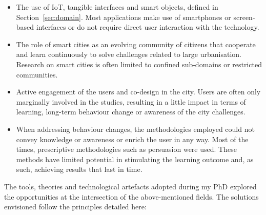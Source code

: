 \begin{itemize}
\item The use of IoT, tangible interfaces and smart objects, defined in Section~\ref{sec:domain}. Most applications make use of smartphones or screen-based interfaces or do not require direct user interaction with the technology.

\item The role of smart cities as an evolving community of citizens that cooperate and learn continuously to solve challenges related to large urbanisation. Research on smart cities is often limited to confined sub-domains or restricted communities.

\item Active engagement of the users and co-design in the city. Users are often only marginally involved in the studies, resulting in a little impact in terms of learning, long-term behaviour change or awareness of the city challenges.

\item When addressing behaviour changes, the methodologies employed could not convey knowledge or awareness or enrich the user in any way. Most of the times, prescriptive methodologies such as persuasion were used. These methods have limited potential in stimulating the learning outcome and, as such, achieving results that last in time.
\end{itemize}

The tools, theories and technological artefacts adopted during my PhD explored the opportunities at the intersection of the above-mentioned fields. The solutions envisioned follow the principles detailed here:

